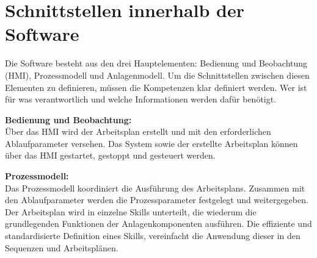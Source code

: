 \section{Schnittstellen innerhalb der Software} \label{Softwareschnittstellen}

	Die Software besteht aus den drei Hauptelementen: Bedienung und Beobachtung (HMI), Prozessmodell und Anlagenmodell. Um die Schnittstellen zwischen diesen Elementen zu definieren, müssen die Kompetenzen klar definiert werden. Wer ist für was verantwortlich und welche Informationen werden dafür benötigt. 
	
	\textbf{Bedienung und Beobachtung:}
	\vspace{2mm} 
	\\
	Über das HMI wird der Arbeitsplan erstellt und mit den erforderlichen Ablaufparameter versehen. Das System sowie der erstellte Arbeitsplan können über das HMI gestartet, gestoppt und gesteuert werden.
	
	\textbf{Prozessmodell:}
	\vspace{2mm} 
	\\
	Das Prozessmodell koordiniert die Ausführung des Arbeitsplans. Zusammen mit den Ablaufparameter werden die Prozessparameter festgelegt und weitergegeben. Der Arbeitsplan wird in einzelne Skills unterteilt, die wiederum die grundlegenden Funktionen der Anlagenkomponenten ausführen. Die effiziente und standardisierte Definition eines Skills, vereinfacht die Anwendung dieser in den Sequenzen und Arbeitsplänen.
	
	\newpage
	
